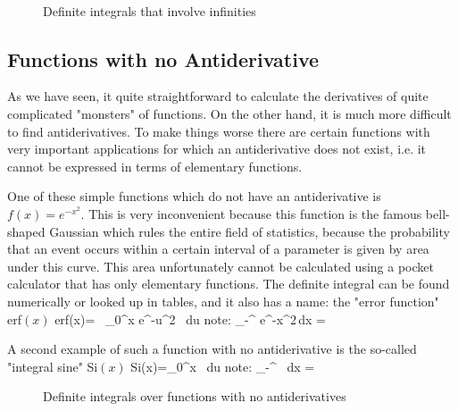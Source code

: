 \begin{figure}[!h]
    \centering
    \hspace*{0.5cm}
    \hspace*{0.5cm}
     \\ \vs
    \hspace*{0.5cm}
    \hspace*{0.5cm}
     \svs
    \caption{Definite integrals that involve infinities}  \label{fig24}
\end{figure} \vs

\subsection{Functions with no Antiderivative}
As we have seen, it quite straightforward to calculate the derivatives of quite complicated
"monsters" of functions. On the other hand, it is much more difficult to find antiderivatives.
To make things worse there are certain functions with very important applications for which
an antiderivative does not exist, i.e. it cannot be expressed in terms of elementary functions.

One of these simple functions which do not have an antiderivative is $f(x)=e^{-x^2}$. This 
is very inconvenient because this function is the famous bell-shaped Gaussian which rules the
entire field of statistics, because the probability that an event occurs within a certain interval
of a parameter is given by area under this curve. This area unfortunately cannot be calculated
using a pocket calculator that has only elementary functions. The definite integral can be 
found numerically or looked up in tables, and it also has a name: the "error function" erf$(x)$
\bnn  
\mbox{erf}(x)= \, \int_0^x e^{-u^2} \, du  \qquad\qquad \mbox{note:}\qquad
\int_{-\infty}^{\infty} e^{-x^2}\,dx = \sqrt{\pi}
\enn  \svs

A second example of such a function with no antiderivative is the so-called "integral sine" Si$(x)$
\bnn 
\mbox{Si}(x)=\int_0^x  \, du  \qquad\qquad \mbox{note:}\qquad
\int_{-\infty}^{\infty}  \, dx = \pi
\enn  
\begin{figure}[t]
    \centerline{
    \hspace*{0.5cm}
    } \svs 
    \caption{Definite integrals over functions with no antiderivatives}  \label{fig24}
\end{figure}




